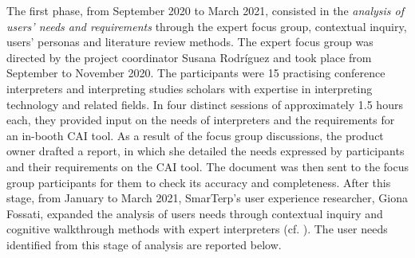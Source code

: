 The first phase, from September 2020 to March 2021, consisted in the \textit{analysis of users’ needs and requirements} through the expert focus group, contextual inquiry, users’ personas and literature review methods. The expert focus group was directed by the project coordinator Susana Rodríguez and took place from September to November 2020. The participants were 15 practising conference interpreters and interpreting studies scholars with expertise in interpreting technology and related fields. In four distinct sessions of approximately 1.5 hours each, they provided input on the needs of interpreters and the requirements for an in-booth CAI tool. As a result of the focus group discussions, the product owner drafted a report, in which she detailed the needs expressed by participants and their requirements on the CAI tool. The document was then sent to the focus group participants for them to check its accuracy and completeness. After this stage, from January to March 2021, SmarTerp’s user experience researcher, Giona Fossati, expanded the analysis of users needs through contextual inquiry and cognitive walkthrough methods with expert interpreters (cf. \cite{fossati2021smarterp}). The user needs identified from this stage of analysis are reported below.

